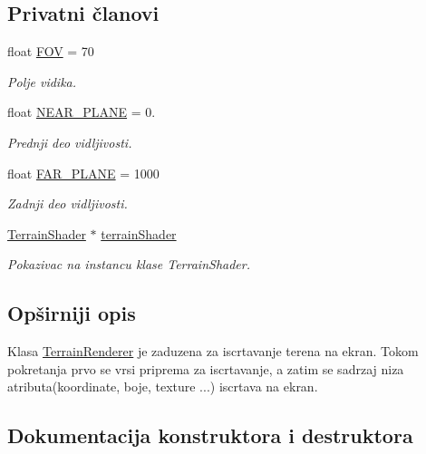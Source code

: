 \subsection*{Privatni članovi}
\begin{DoxyCompactItemize}
\item 
float \hyperlink{classcore_1_1TerrainRenderer_a912eab623ca8c7ca7d8473e30383f831}{F\+OV} = 70
\begin{DoxyCompactList}\small\item\em Polje vidika. \end{DoxyCompactList}\item 
float \hyperlink{classcore_1_1TerrainRenderer_a68bdfd4b42381b4514991fe8c4d08c89}{N\+E\+A\+R\+\_\+\+P\+L\+A\+NE} = 0.
\begin{DoxyCompactList}\small\item\em Prednji deo vidljivosti. \end{DoxyCompactList}\item 
float \hyperlink{classcore_1_1TerrainRenderer_abc56752e01a0b9b0ebfd57b8daa6172c}{F\+A\+R\+\_\+\+P\+L\+A\+NE} = 1000
\begin{DoxyCompactList}\small\item\em Zadnji deo vidljivosti. \end{DoxyCompactList}\item 
\hyperlink{classshader_1_1TerrainShader}{Terrain\+Shader} $\ast$ \hyperlink{classcore_1_1TerrainRenderer_a6db721ffef6f7175977ad243b4ac2834}{terrain\+Shader}
\begin{DoxyCompactList}\small\item\em Pokazivac na instancu klase Terrain\+Shader. \end{DoxyCompactList}\end{DoxyCompactItemize}


\subsection{Opširniji opis}
Klasa \hyperlink{classcore_1_1TerrainRenderer}{Terrain\+Renderer} je zaduzena za iscrtavanje terena na ekran. Tokom pokretanja prvo se vrsi priprema za iscrtavanje, a zatim se sadrzaj niza atributa(koordinate, boje, texture ...) iscrtava na ekran. 

\subsection{Dokumentacija konstruktora i destruktora}
\mbox{\label{classcore_1_1TerrainRenderer_aef52c32054bf2be3fc5ec160a2d7433b}} 
